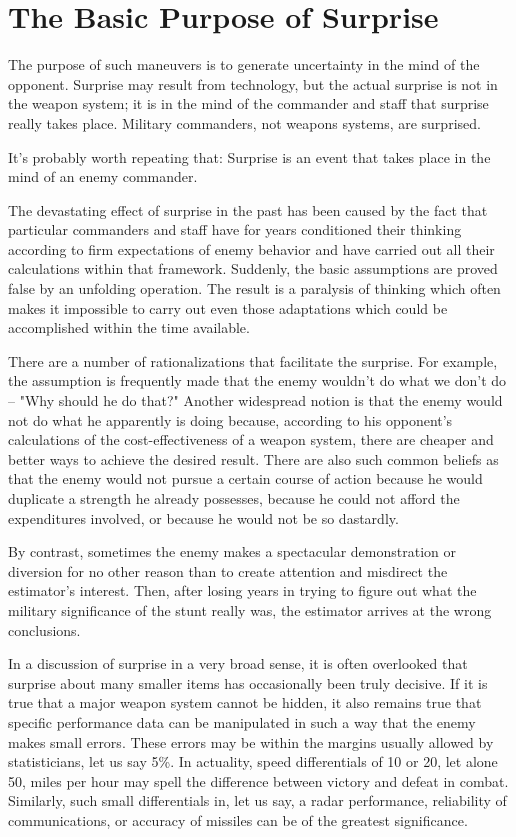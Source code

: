 \section{The Basic Purpose of Surprise}
The purpose of such maneuvers is to generate uncertainty in the mind of the opponent. Surprise may result from technology, but the actual surprise is not in the weapon system; it is in the mind of the commander and staff that surprise really takes place. Military commanders, not weapons systems, are surprised.

It’s probably worth repeating that: Surprise is an event that takes place in the mind of an enemy commander.

The devastating effect of surprise in the past has been caused by the fact that particular commanders and staff have for years conditioned their thinking according to firm expectations of enemy behavior and have carried out all their calculations within that framework. Suddenly, the basic assumptions are proved false by an unfolding operation. The result is a paralysis of thinking which often makes it impossible to carry out even those adaptations which could be accomplished within the time available.

There are a number of rationalizations that facilitate the surprise. For example, the assumption is frequently made that the enemy wouldn't do what we don't do -- "Why should he do that?" Another widespread notion is that the enemy would not do what he apparently is doing because, according to his opponent's calculations of the cost-effectiveness of a weapon system, there are cheaper and better ways to achieve the desired result. There are also such common beliefs as that the enemy would not pursue a certain course of action because he would duplicate a strength he already possesses, because he could not afford the expenditures involved, or because he would not be so dastardly.

By contrast, sometimes the enemy makes a spectacular demonstration or diversion for no other reason than to create attention and misdirect the estimator's interest. Then, after losing years in trying to figure out what the military significance of the stunt really was, the estimator arrives at the wrong conclusions.

In a discussion of surprise in a very broad sense, it is often overlooked that surprise about many smaller items has occasionally been truly decisive. If it is true that a major weapon system cannot be hidden, it also remains true that specific performance data can be manipulated in such a way that the enemy makes small errors. These errors may be within the margins usually allowed by statisticians, let us say 5\%. In actuality, speed differentials of 10 or 20, let alone 50, miles per hour may spell the difference between victory and defeat in combat. Similarly, such small differentials in, let us say, a radar performance, reliability of communications, or accuracy of missiles can be of the greatest significance.

